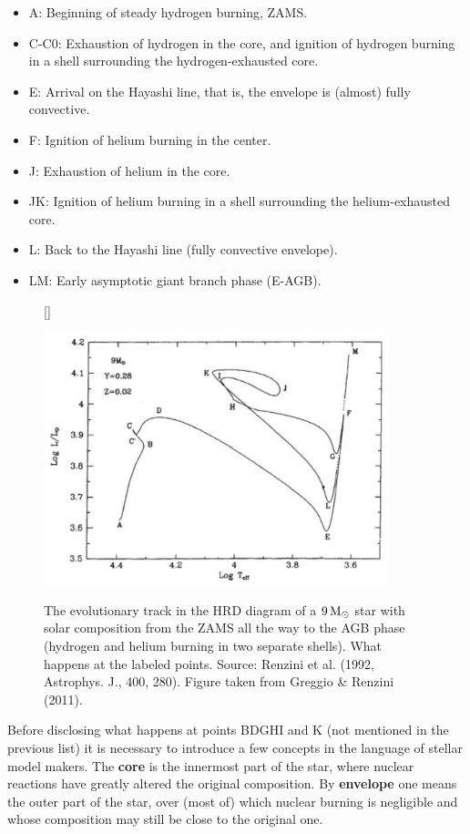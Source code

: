 \documentclass[a4paper,10pt]{article}
\begin{document}
\begin{itemize}
    \item A: Beginning of steady hydrogen burning, ZAMS.
    \item C-C0: Exhaustion of hydrogen in the core, and ignition of hydrogen burning in a shell surrounding the hydrogen-exhausted core.
    \item E: Arrival on the Hayashi line, that is, the envelope is (almost) fully convective.
    \item F: Ignition of helium burning in the center.
    \item J: Exhaustion of helium in the core.
    \item JK: Ignition of helium burning in a shell surrounding the helium-exhausted core.
    \item L: Back to the Hayashi line (fully convective envelope).
    \item LM: Early asymptotic giant branch phase (E-AGB).
\end{itemize}

\begin{figure}[h]
    [\FBwidth]
    {\caption{\footnotesize{The evolutionary track in the HRD diagram of a $9\,{\rm M_\odot}$ star with solar composition from the ZAMS all the way to the AGB phase (hydrogen and helium burning in two separate shells). What happens at the labeled points. Source: Renzini et al. (1992, Astrophys. J., 400, 280). Figure taken from Greggio \& Renzini (2011).}}
    \label{fig:hrd9}}
    {\includegraphics[width=10cm]{figures/HRD_9M.png}}
\end{figure}

{\noindent}Before disclosing what happens at points BDGHI and K (not mentioned in the previous list) it is necessary to introduce a few concepts in the language of stellar model makers. The \textbf{core} is the innermost part of the star, where nuclear reactions have greatly altered the original composition. By \textbf{envelope} one means the outer part of the star, over (most of) which nuclear burning is negligible and whose composition may still be close to the original one.
\end{document}
